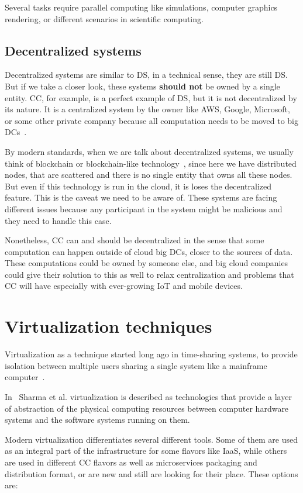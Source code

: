 Several tasks require parallel computing like simulations, computer graphics rendering, or different scenarios in scientific computing.
%
%
\subsection{Decentralized systems}\label{sec:decentralized_systems}
%
Decentralized systems are similar to DS, in a technical sense, they are still DS. But if we take a closer look, these systems \textbf{should not} be owned by a single entity. CC, for example, is a perfect example of DS, but it is not decentralized by its nature. It is a centralized system by the owner like AWS, Google, Microsoft, or some other private company because all computation needs to be moved to big DCs~\cite{HossainRH18}.

By modern standards, when we are talk about decentralized systems, we usually think of blockchain or blockchain-like technology~\cite{LeibleSSG19}, since here we have distributed nodes, that are scattered and there is no single entity that owns all these nodes. But even if this technology is run in the cloud, it is loses the decentralized feature. This is the caveat we need to be aware of. These systems are facing different issues because any participant in the system might be malicious and they need to handle this case. 

Nonetheless, CC can and should be decentralized in the sense that some computation can happen outside of cloud big DCs, closer to the sources of data. These computations could be owned by someone else, and big cloud companies could give their solution to this as well to relax centralization and problems that CC will have especially with ever-growing IoT and mobile devices.
%
%
\section{Virtualization techniques}\label{sec:virtualization_techniques}
%
Virtualization as a technique started long ago in time-sharing systems, to provide isolation between multiple users sharing a single system like a mainframe computer~\cite{CrosbyB06}. 

In~\cite{Sharma} Sharma et al. virtualization is described as technologies that provide a layer of abstraction of the physical computing resources between computer hardware systems and the software systems running on them.

Modern virtualization differentiates several different tools. Some of them are used as an integral part of the infrastructure for some flavors like IaaS, while others are used in different CC flavors as well as microservices packaging and distribution format, or are new and still are looking for their place. These options are:

